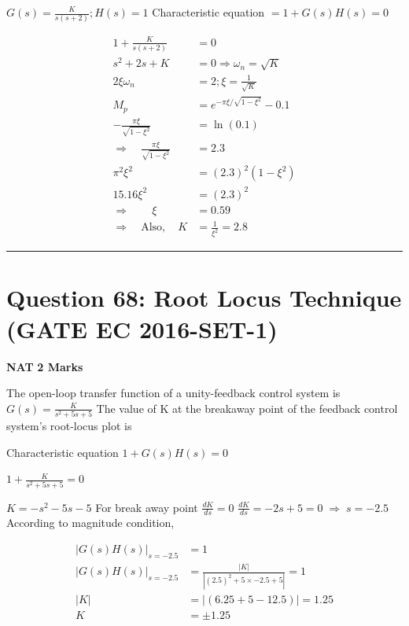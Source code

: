 \documentclass[11pt,a4paper]{article}
\begin{document}
\begin{tcolorbox}[solbox, title=Detailed Solution -- Question 67]
$G(s)=\frac{K}{s(s+2)} ; H(s)=1$
 Characteristic equation $=1+G(s) H(s)=0$

\[
\begin{aligned} 1+\frac{K}{s(s+2)} &=0 \\ s^{2}+2 s+K &=0 \Rightarrow \omega_{n}=\sqrt{K} \\ 2 \xi \omega_{n} &=2 ; \xi=\frac{1}{\sqrt{K}} \\ M_{p}&=e^{-\pi\xi/\sqrt{1-\xi^{2}}}-0.1\\ -\frac{\pi \xi}{\sqrt{1-\xi^{2}}} &=\ln (0.1) \\ \Rightarrow \quad\frac{\pi \xi}{\sqrt{1-\xi^{2}}} &=2.3 \\ \pi^{2} \xi^{2} &=(2.3)^{2}\left(1-\xi^{2}\right) \\ 15.16 \xi^{2} &=(2.3)^{2} \\ \Rightarrow \qquad \xi&=0.59 \\ \Rightarrow \quad \text{Also}, \quad K&=\frac{1}{\xi^{2}}=2.8 \end{aligned}
\]
\end{tcolorbox}

\vspace{1.5em}
\hrule
\vspace{1.5em}

\section*{Question 68: Root Locus Technique (GATE EC 2016-SET-1)}
\noindent \textbf{\color{primary}NAT} \hfill \textbf{\color{secondary}2 Marks}


\noindent The open-loop transfer function of a unity-feedback control system is 
$G(s)=\frac{K}{s^{2}+5s+5}$ 
The value of K at the breakaway point of the feedback control system's root-locus plot is \underline{\hspace{1.5cm}}


\begin{tcolorbox}[solbox, title=Detailed Solution -- Question 68]
Characteristic equation  $1+G(s)H(s)=0$

$1+\frac{K}{s^2+5s+5}=0$

$K=-s^2-5s-5$
For break away point $\frac{dK}{ds}=0$
$\frac{dK}{ds}=-2s+5=0\;\Rightarrow \; s=-2.5$
According to magnitude condition,

\[
\begin{aligned} |G(s)H(s)|_{s=-2.5} &=1 \\ |G(s)H(s)|_{s=-2.5} &=\frac{|K|}{|(2.5)^2 +5 \times -2.5+5|}=1 \\ |K|&=|(6.25+5-12.5)|=1.25 \\ K&=\pm 1.25 \end{aligned}
\]
\end{tcolorbox}
\end{document}
